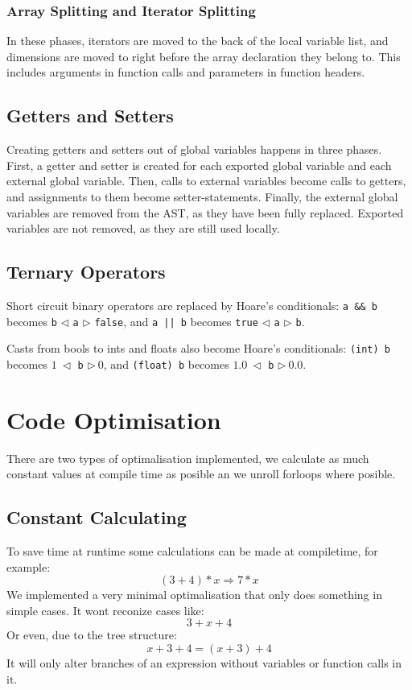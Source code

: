\documentclass[a4paper,11pt]{report}
\begin{document}
\subsubsection{Array Splitting and Iterator Splitting}
In these phases, iterators are moved to the back of the local variable list, and dimensions are moved to right before the array declaration they belong to. This includes arguments in function calls and parameters in function headers.

\subsection{Getters and Setters}
Creating getters and setters out of global variables happens in three phases. First, a getter and setter is created for each exported global variable and each external global variable. Then, calls to external variables become calls to getters, and assignments to them become setter-statements. Finally, the external global variables are removed from the AST, as they have been fully replaced. Exported variables are not removed, as they are still used locally.
\subsection{Ternary Operators}
Short circuit binary operators are replaced by Hoare's conditionals: \texttt{a \&\& b} becomes \texttt{b} $\triangleleft$ \texttt{a} $\triangleright$ \texttt{false}, and \texttt{a || b} becomes \texttt{true} $\triangleleft$ \texttt{a} $\triangleright$ \texttt{b}.

Casts from bools to ints and floats also become Hoare's conditionals: \texttt{(int) b} becomes $1~\triangleleft$ \texttt{b} $\triangleright~0$, and \texttt{(float) b} becomes $1.0~\triangleleft$ \texttt{b} $\triangleright~0.0$.

\section{Code Optimisation}
There are two types of optimalisation implemented, we calculate as much constant values at compile time as posible an we unroll forloops where posible.
\subsection{Constant Calculating}
To save time at runtime some calculations can be made at compiletime, for example:
\[
(3+4)*x \Rightarrow 7*x
\]
We implemented a very minimal optimalisation that only does something in simple cases.
It wont reconize cases like:
\[
3+x+4
\]
Or even, due to the tree structure:
\[
x+3+4 = (x+3)+4
\]
It will only alter branches of an expression without variables or function calls in it.
\end{document}
